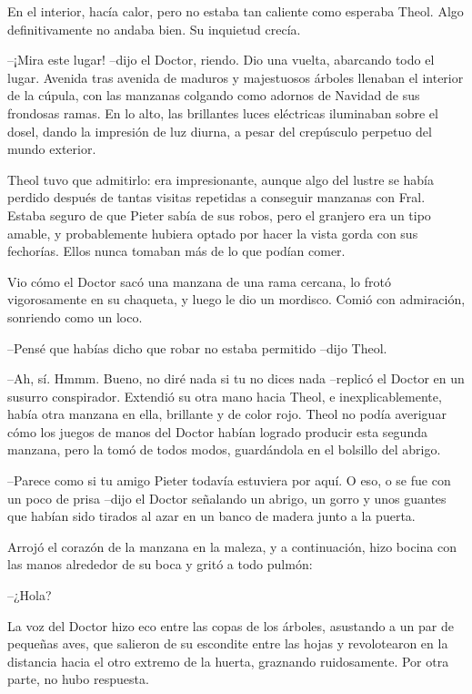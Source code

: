 En el interior, hacía calor, pero no estaba tan caliente como esperaba Theol. Algo definitivamente no andaba bien. Su inquietud crecía.



--¡Mira este lugar! --dijo el Doctor, riendo. Dio una vuelta, abarcando todo el lugar. Avenida tras avenida de maduros y majestuosos árboles llenaban el interior de la cúpula, con las manzanas colgando como adornos de Navidad de sus frondosas ramas. En lo alto, las brillantes luces eléctricas iluminaban sobre el dosel, dando la impresión de luz diurna, a pesar del crepúsculo perpetuo del mundo exterior.



Theol tuvo que admitirlo: era impresionante, aunque algo del lustre se había perdido después de tantas visitas repetidas a conseguir manzanas con Fral. Estaba seguro de que Pieter sabía de sus robos, pero el granjero era un tipo amable, y probablemente hubiera optado por hacer la vista gorda con sus fechorías. Ellos nunca tomaban más de lo que podían comer.



Vio cómo el Doctor sacó una manzana de una rama cercana, lo frotó vigorosamente en su chaqueta, y luego le dio un mordisco. Comió con admiración, sonriendo como un loco.



--Pensé que habías dicho que robar no estaba permitido --dijo Theol.



--Ah, sí. Hmmm. Bueno, no diré nada si tu no dices nada --replicó el Doctor en un susurro conspirador. Extendió su otra mano hacia Theol, e inexplicablemente, había otra manzana en ella, brillante y de color rojo. Theol no podía averiguar cómo los juegos de manos del Doctor habían logrado producir esta segunda manzana, pero la tomó de todos modos, guardándola en el bolsillo del abrigo.



--Parece como si tu amigo Pieter todavía estuviera por aquí. O eso, o se fue con un poco de prisa --dijo el Doctor señalando un abrigo, un gorro y unos guantes que habían sido tirados al azar en un banco de madera junto a la puerta.


Arrojó el corazón de la manzana en la maleza, y a continuación, hizo bocina con las manos alrededor de su boca y gritó a todo pulmón:

 --¿Hola?



La voz del Doctor hizo eco entre las copas de los árboles, asustando a un par de pequeñas aves, que salieron de su escondite entre las hojas y revolotearon en la distancia hacia el otro extremo de la huerta, graznando ruidosamente. Por otra parte, no hubo respuesta.



